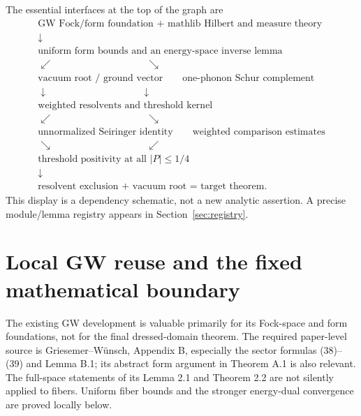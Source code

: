 \documentclass[11pt,a4paper]{article}
\theoremstyle{remark}\newtheorem{remark}[theorem]{Remark}
\newcommand{\abs}[1]{\lvert #1\rvert}\newcommand{\rankone}[2]{\lvert #1\rangle\langle #2\rvert}
\begin{document}
The essential interfaces at the top of the graph are
\[
\begin{array}{c}
\text{GW Fock/form foundation + mathlib Hilbert and measure theory}\\
\downarrow\\
\text{uniform form bounds and an energy-space inverse lemma}\\
\swarrow\hspace{4cm}\searrow\\[-2mm]
\text{vacuum root / ground vector}\qquad\text{one-phonon Schur complement}\\
\downarrow\hspace{4cm}\downarrow\\[-2mm]
\text{weighted resolvents and threshold kernel}\\
\swarrow\hspace{4cm}\searrow\\[-2mm]
\text{unnormalized Seiringer identity}\qquad\text{weighted comparison estimates}\\
\searrow\hspace{4cm}\swarrow\\[-2mm]
\text{threshold positivity at all }\abs P\leq1/4\\
\downarrow\\
\text{resolvent exclusion + vacuum root = target theorem.}
\end{array}
\]
This display is a dependency schematic, not a new analytic assertion. A precise module/lemma registry appears in Section~\ref{sec:registry}.

\section{Local GW reuse and the fixed mathematical boundary}\label{sec:gw}
The existing GW development is valuable primarily for its Fock-space and form foundations, not for the final dressed-domain theorem. The required paper-level source is Griesemer--W\"unsch, Appendix B, especially the sector formulas (38)--(39) and Lemma B.1; its abstract form argument in Theorem A.1 is also relevant. The full-space statements of its Lemma 2.1 and Theorem 2.2 are not silently applied to fibers. Uniform fiber bounds and the stronger energy-dual convergence are proved locally below.\cite{gw}
\end{document}
